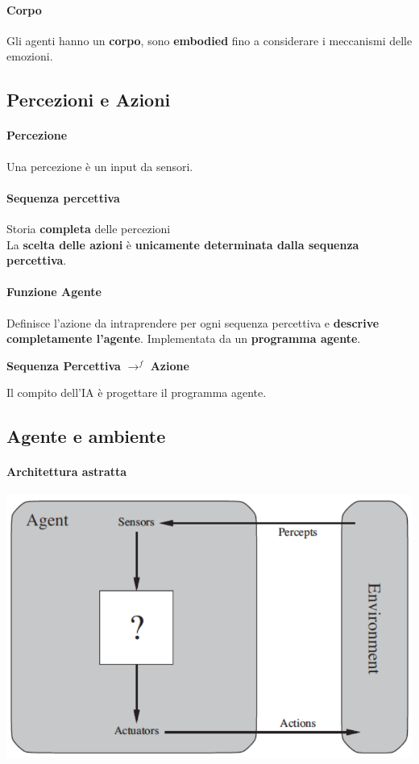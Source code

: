 \documentclass[10pt]{book}
\begin{document}
\paragraph{Corpo} Gli agenti hanno un \textbf{corpo}, sono \textbf{embodied} fino a considerare i meccanismi delle emozioni.
\subsection{Percezioni e Azioni}
\paragraph{Percezione} Una percezione è un input da sensori.
\paragraph{Sequenza percettiva} Storia \textbf{completa} delle percezioni\\
La \textbf{scelta delle azioni} è \textbf{unicamente determinata dalla sequenza percettiva}.
\paragraph{Funzione Agente} Definisce l'azione da intraprendere per ogni sequenza percettiva e \textbf{descrive completamente l'agente}. Implementata da un \textbf{programma agente}.
\begin{center}
	\textbf{Sequenza Percettiva} $\longrightarrow^f$ \textbf{Azione}
\end{center}
Il compito dell'IA è progettare il programma agente.
\subsection{Agente e ambiente}
\paragraph{Architettura astratta}
\begin{center}
	\includegraphics[scale=0.7]{ambiente.png}
\end{center}
\end{document}
